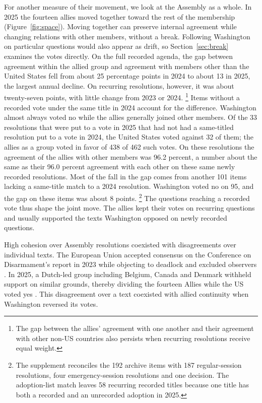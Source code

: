 \documentclass[12pt,authoryear]{elsarticle}
\begin{document}
For another measure of their movement, we look at the Assembly as a whole. In 2025 the fourteen allies moved together toward the rest of the membership (Figure~\ref{fig:space}). Moving together can preserve internal agreement while changing relations with other members, without a break. Following Washington on particular questions would also appear as drift, so Section~\ref{sec:break} examines the votes directly. On the full recorded agenda, the gap between agreement within the allied group and agreement with members other than the United States fell from about 25 percentage points in 2024 to about 13 in 2025, the largest annual decline. On recurring resolutions, however, it was about twenty-seven points, with little change from 2023 or 2024. \footnote{The gap between the allies' agreement with one another and their agreement with other non-US countries also persists when recurring resolutions receive equal weight.} Items without a recorded vote under the same title in 2024 account for the difference. Washington almost always voted no while the allies generally joined other members. Of the 33 resolutions that were put to a vote in 2025 that had not had a same-titled resolution put to a vote in 2024, the United States voted against 32 of them; the allies as a group voted in favor of 438 of 462 such votes. On these resolutions the agreement of the allies with other members was 96.2 percent, a number about the same as their 96.0 percent agreement with each other on these same newly recorded resolutions. Most of the fall in the gap comes from another 101 items lacking a same-title match to a 2024 resolution. Washington voted no on 95, and the gap on these items was about 8 points. \footnote{The supplement reconciles the 192 archive items with 187 regular-session resolutions, four emergency-session resolutions and one decision. The adoption-list match leaves 58 recurring recorded titles because one title has both a recorded and an unrecorded adoption in 2025.} The questions reaching a recorded vote thus shape the joint move. The allies kept their votes on recurring questions and usually supported the texts Washington opposed on newly recorded questions.

High cohesion over Assembly resolutions coexisted with disagreements over individual texts. The European Union accepted consensus on the Conference on Disarmament's report in 2023 while objecting to deadlock and excluded observers \citep[p.~35]{un:2023:p3record}. In 2025, a Dutch-led group including Belgium, Canada and Denmark withheld support on similar grounds, thereby dividing the fourteen Allies while the US voted yes \citep{netherlands:2025:cd}. This disagreement over a text coexisted with allied continuity when Washington reversed its votes.
\end{document}
